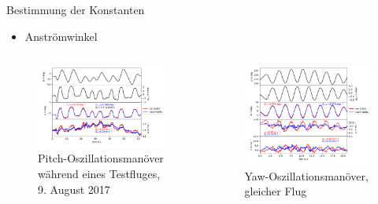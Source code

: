 \documentclass[ucs,9pt]{beamer}
\begin{document}
\begin{frame}{Bestimmung der Konstanten}
	\begin{itemize}
		\item Anströmwinkel
	\end{itemize}
	\begin{columns}
		\begin{column}{0.48\textwidth}
			\begin{figure}
				\includegraphics[width=\textwidth]{./docmedia/alpha_osz.pdf}
				\caption{Pitch-Oszillationsmanöver während eines Testfluges, 9. August 2017}
			\end{figure}
		\end{column}
		\begin{column}{0.48\textwidth}
			\begin{figure}
				\includegraphics[width=\textwidth]{./docmedia/beta_osz.pdf}
				\caption{Yaw-Oszillationsmanöver, gleicher Flug}
			\end{figure}
		\end{column}
	\end{columns}
\end{frame}
\end{document}
